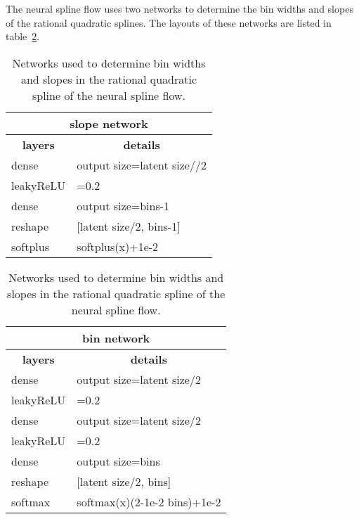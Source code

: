 \documentclass[10pt]{article} \usepackage[accepted]{tmlr}
\begin{document}
The neural spline flow uses two networks to determine the bin widths and slopes of the rational quadratic splines. The layouts of these networks are listed in table~\ref{tab:bin_archi}. 
\begin{table}[h]
\begin{tabular}{ll}
\multicolumn{2}{c}{\textbf{slope network}}                                        \\ \hline
\multicolumn{1}{c|}{\textbf{layers}} & \multicolumn{1}{c}{\textbf{details}}       \\ \hline
\multicolumn{1}{l|}{dense}           & output size=latent size//2               \\
\multicolumn{1}{l|}{leakyReLU}       & =0.2                                  \\
\multicolumn{1}{l|}{dense}           & output size=bins-1                      \\
\multicolumn{1}{l|}{reshape}         & {[}latent size/2, bins-1{]} \\
\multicolumn{1}{l|}{softplus}        & softplus(x)+1e-2  \\     

\end{tabular}
\hfill
\begin{tabular}{ll}
\multicolumn{2}{c}{\textbf{bin network}}                                       \\ \hline
\multicolumn{1}{c|}{\textbf{layers}} & \multicolumn{1}{c}{\textbf{details}}     \\ \hline
\multicolumn{1}{l|}{dense}          & output size=latent size/2             \\
\multicolumn{1}{l|}{leakyReLU}      & =0.2                                \\
\multicolumn{1}{l|}{dense}          & output size=latent size/2            \\
\multicolumn{1}{l|}{leakyReLU}      & =0.2                                \\
\multicolumn{1}{l|}{dense}          & output size=bins                       \\
\multicolumn{1}{l|}{reshape}        & {[}latent size/2, bins{]} \\
\multicolumn{1}{l|}{softmax}        & softmax(x)(2-1e-2 bins)+1e-2   
\end{tabular}
\caption{\label{tab:bin_archi} Networks used to determine bin widths and slopes in the rational quadratic spline of the neural spline flow.}
\end{table}
\end{document}
